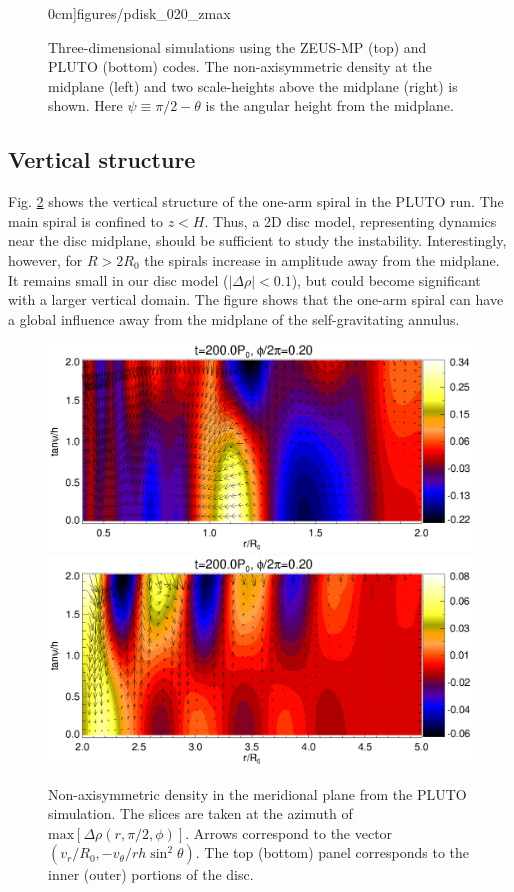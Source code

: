 \begin{figure}
\begin{center}
{      0cm]{figures/pdisk_020_zmax}
    }
  \end{center}
  \caption{Three-dimensional simulations using the ZEUS-MP (top) and 
    PLUTO (bottom) codes. The non-axisymmetric density at the midplane (left) and
    two scale-heights above the midplane (right) is shown. Here $\psi
    \equiv \pi/2 - \theta$ is the angular height  
    from the midplane.\label{3d_prelim}}   
\end{figure}

\subsection{Vertical structure}
Fig. \ref{3d_rz} shows the vertical structure of the one-arm
spiral in the PLUTO run. The main spiral is confined to $z < H$. Thus,
a 2D disc model, representing dynamics near the disc midplane, 
should be sufficient to study the instability. Interestingly, however, for $R>2R_0$ the
spirals  increase in amplitude away from the midplane. It remains
small in our disc model ($|\Delta\rho| < 0.1$), but could become 
significant with a larger vertical domain. The figure shows that 
the one-arm spiral can have a global influence away from the
midplane of the self-gravitating annulus.

\begin{figure}
  \includegraphics[scale=0.47,clip=true,trim=0cm 0.79cm 0cm 0cm]{figures/pdisk_rz_020_sg.ps}
  \includegraphics[scale=0.47,clip=true,trim=0cm 0cm 0cm 0.64cm]{figures/pdisk_rz_020_nsg.ps}
  \caption{Non-axisymmetric density in the meridional plane from the
    PLUTO simulation. The slices are taken at the azimuth of   
    $\mathrm{max}[\Delta\rho(r,\pi/2,\phi)]$. Arrows correspond to the vector 
    $(v_r/R_0,-v_\theta/rh\sin^2{\theta})$. The top (bottom) panel corresponds
    to the inner (outer) portions of the disc. 
    \label{3d_rz}} 
\end{figure}   

